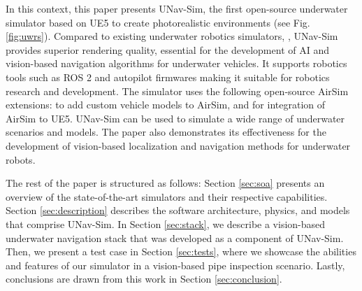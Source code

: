 In this context, this paper presents UNav-Sim, the first open-source underwater simulator based on \ac{UE5} to create photorealistic environments (see Fig. \ref{fig:uwrs}). Compared to existing underwater robotics simulators, \cite{holoocean,uuv,dave,marus}, UNav-Sim provides superior rendering quality, essential for the development of \ac{AI} and vision-based navigation algorithms for underwater vehicles. It supports robotics tools such as ROS 2 and autopilot firmwares making it suitable for robotics research and development. The simulator uses the following open-source AirSim \cite{airsim} extensions: \cite{byu_vtol} to add custom vehicle models to AirSim, and \cite{coles} for integration of AirSim to \ac{UE5}. UNav-Sim can be used to simulate a wide range of underwater scenarios and models. The paper also demonstrates its effectiveness for the development of vision-based localization and navigation methods for underwater robots. 

The rest of the paper is structured as follows: Section \ref{sec:soa} presents an overview of the state-of-the-art simulators and their respective capabilities. Section \ref{sec:description} describes the software architecture, physics, and models that comprise UNav-Sim. In Section \ref{sec:stack}, we describe a vision-based underwater navigation stack that was developed as a component of UNav-Sim. Then, we present a test case in Section \ref{sec:tests}, where we showcase the abilities and features of our simulator in a vision-based pipe inspection scenario. Lastly, conclusions are drawn from this work in Section \ref{sec:conclusion}.

